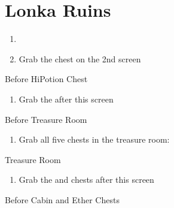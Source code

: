 \chapter{Lonka Ruins}

\vspace{\baselineskip}

\begin{paracol}{2}

\begin{enumerate}
    \item {}
    \item Grab the  chest on the 2nd screen
\end{enumerate}

\switchcolumn
\begin{misc}{Before HiPotion Chest}
\end{misc}

\switchcolumn
\resume
\begin{enumerate}[resume]
    \item Grab the  after this screen
\end{enumerate}

\switchcolumn
\begin{misc}{Before Treasure Room}
\end{misc}

\switchcolumn
\newpage
\begin{enumerate}[resume]
    \item Grab all five chests in the treasure room: 
\end{enumerate}

\switchcolumn
\begin{misc}{Treasure Room}
\end{misc}

\switchcolumn*
\begin{enumerate}[resume]
    \item Grab the  and  chests after this screen
\end{enumerate}

\switchcolumn
\begin{misc}{Before Cabin and Ether Chests}
\end{misc}


\end{paracol}
